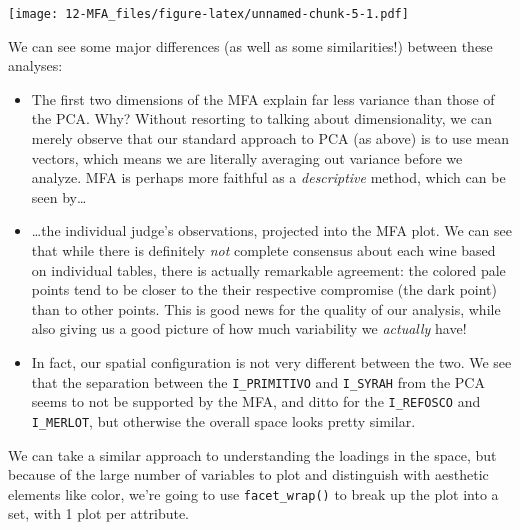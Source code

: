 \documentclass[
]{book}
\newenvironment{Shaded}{\begin{snugshade}}{\end{snugshade}}
\newcommand{\CommentTok}[1]{\textcolor[rgb]{0.56,0.35,0.01}{\textit{#1}}}
\newcommand{\NormalTok}[1]{#1}
\newcommand{\SpecialCharTok}[1]{\textcolor[rgb]{0.81,0.36,0.00}{\textbf{#1}}}
\providecommand{\tightlist}{%
  \setlength{\itemsep}{0pt}\setlength{\parskip}{0pt}}
\begin{document}
\texttt{[image: 12-MFA\_files/figure-latex/unnamed-chunk-5-1.pdf]}

We can see some major differences (as well as some similarities!) between these analyses:

\begin{itemize}
\tightlist
\item
  The first two dimensions of the MFA explain far less variance than those of the PCA. Why? Without resorting to talking about dimensionality, we can merely observe that our standard approach to PCA (as above) is to use mean vectors, which means we are literally averaging out variance before we analyze. MFA is perhaps more faithful as a \emph{descriptive} method, which can be seen by\ldots{}
\item
  \ldots the individual judge's observations, projected into the MFA plot. We can see that while there is definitely \emph{not} complete consensus about each wine based on individual tables, there is actually remarkable agreement: the colored pale points tend to be closer to the their respective compromise (the dark point) than to other points. This is good news for the quality of our analysis, while also giving us a good picture of how much variability we \emph{actually} have!
\item
  In fact, our spatial configuration is not very different between the two. We see that the separation between the \texttt{I\_PRIMITIVO} and \texttt{I\_SYRAH} from the PCA seems to not be supported by the MFA, and ditto for the \texttt{I\_REFOSCO} and \texttt{I\_MERLOT}, but otherwise the overall space looks pretty similar.
\end{itemize}

We can take a similar approach to understanding the loadings in the space, but because of the large number of variables to plot and distinguish with aesthetic elements like color, we're going to use \texttt{facet\_wrap()} to break up the plot into a set, with 1 plot per attribute.

\begin{Shaded}
\end{Shaded}
\end{document}
